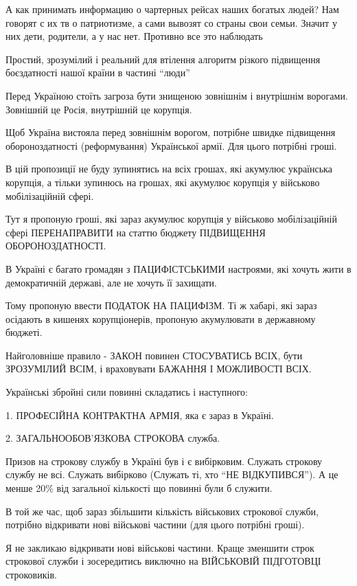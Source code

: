 \begin{itemize}

А как принимать информацию о чартерных рейсах наших богатых людей? Нам говорят
с их тв о патриотизме, а сами вывозят со страны свои семьи. Значит у них дети,
родители, а у нас нет. Противно все это наблюдать


Простий, зрозумілий і реальний для втілення алгоритм різкого підвищення
боєздатності нашої країни в частині \enquote{люди}

Перед Україною стоїть загроза бути знищеною зовнішнім і внутрішнім ворогами.
Зовнішній це Росія, внутрішній це корупція.

Щоб Україна вистояла перед зовнішнім ворогом, потрібне швидке підвищення
обороноздатності (реформування) Української армії. Для цього потрібні гроші.

В цій пропозиції не буду зупинятись на всіх грошах, які акумулює українська
корупція, а тільки зупинюсь на грошах, які акумулює корупція у військово
мобілізаційній сфері.

Тут я пропоную гроші, які зараз акумулює корупція у військово мобілізаційній
сфері ПЕРЕНАПРАВИТИ на статтю бюджету ПІДВИЩЕННЯ ОБОРОНОЗДАТНОСТІ.

В Україні є багато громадян з ПАЦИФІСТСЬКИМИ настроями, які хочуть жити в
демократичній державі, але не хочуть її захищати.

Тому пропоную ввести ПОДАТОК НА ПАЦИФІЗМ. Ті ж хабарі, які зараз осідають в
кишенях корупціонерів, пропоную акумулювати в державному бюджеті.

Найголовніше правило - ЗАКОН повинен СТОСУВАТИСЬ ВСІХ, бути ЗРОЗУМІЛИЙ ВСІМ, і
враховувати БАЖАННЯ І МОЖЛИВОСТІ ВСІХ.

Українські збройні сили повинні складатись і наступного:

1. ПРОФЕСІЙНА КОНТРАКТНА АРМІЯ, яка є зараз в Україні.

2. ЗАГАЛЬНООБОВ'ЯЗКОВА СТРОКОВА служба.

Призов на строкову службу в Україні був і є вибірковим. Служать строкову службу
не всі. Служать вибірково (Служать ті, хто \enquote{НЕ ВІДКУПИВСЯ}). А це менше 20\%
від загальної кількості що повинні були б служити.

В той же час, щоб зараз збільшити кількість військових строкової служби,
потрібно відкривати нові військові частини (для цього потрібні гроші).

Я не закликаю відкривати нові військові частини. Краще зменшити строк строкової
служби і зосередитись виключно на ВІЙСЬКОВІЙ ПІДГОТОВЦІ строковиків.


\end{itemize}
